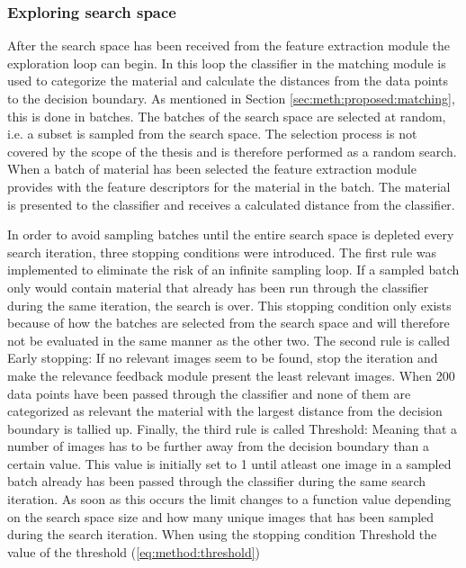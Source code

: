 \subsubsection{Exploring search space}
\label{sec:method:proposed:matching:search}
After the search space has been received from the feature extraction module the exploration loop can begin. In this loop the classifier in the matching module is used to categorize the material and calculate the distances from the data points to the decision boundary. As mentioned in Section \ref{sec:meth:proposed:matching}, this is done in batches. The batches of the search space are selected at random, i.e. a subset is sampled from the search space. The selection process is not covered by the scope of the thesis and is therefore performed as a random search. When a batch of material has been selected the feature extraction module provides with the feature descriptors for the material in the batch. The material is presented to the classifier and receives a calculated distance from the classifier. 

In order to avoid sampling batches until the entire search space is depleted every search iteration, three stopping conditions were introduced. The first rule was implemented to eliminate the risk of an infinite sampling loop. If a sampled batch only would contain material that already has been run through the classifier during the same iteration, the search is over. This stopping condition only exists because of how the batches are selected from the search space and will therefore not be evaluated in the same manner as the other two. The second rule is called Early stopping: If no relevant images seem to be found, stop the iteration and make the relevance feedback module present the least relevant images. When 200 data points have been passed through the classifier and none of them are categorized as relevant the material with the largest distance from the decision boundary is tallied up. Finally, the third rule is called Threshold: Meaning that a number of images has to be further away from the decision boundary than a certain value. This value is initially set to 1 until atleast one image in a sampled batch already has been passed through the classifier during the same search iteration. As soon as this occurs the limit changes to a function value depending on the search space size and how many unique images that has been sampled during the search iteration. When using the stopping condition Threshold the value of the threshold (\ref{eq:method:threshold})

